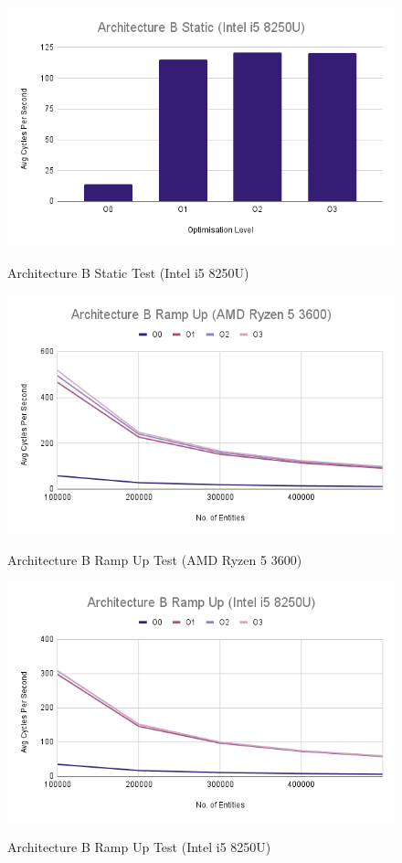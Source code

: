 \documentclass{article}
\begin{document}
\begin{figure}[!h]
\centering
\includegraphics[scale=0.5]{Architecture B Static (Intel i5 8250U).png}
\label{arch_b_static_laptop}
\caption{Architecture B Static Test (Intel i5 8250U)}
\end{figure}

\begin{figure}[!h]
\centering
\includegraphics[scale=0.5]{Architecture B Ramp Up (AMD Ryzen 5 3600).png}
\label{arch_b_ramp_up_pc}
\caption{Architecture B Ramp Up Test (AMD Ryzen 5 3600)}
\end{figure}

\begin{figure}[!h]
\centering
\includegraphics[scale=0.5]{Architecture B Ramp Up (Intel i5 8250U).png}
\label{arch_b_ramp_up_laptop}
\caption{Architecture B Ramp Up Test (Intel i5 8250U)}
\end{figure}
\end{document}
